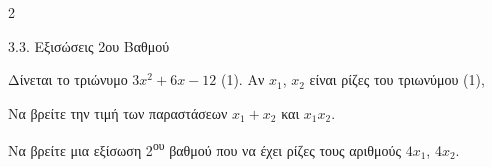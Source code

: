 \begin{ylh}{2}
    \item 3.3. Εξισώσεις 2ου Βαθμού
\end{ylh}
Δίνεται το τριώνυμο $3x^{2} + 6x - 12$ (1). Αν $x_{1}$, $x_{2}$ είναι ρίζες του τριωνύμου (1),

\begin{alist}
\item Να βρείτε την τιμή των παραστάσεων $x_{1} + x_{2}$ και $x_{1}x_{2}$.
\item Να βρείτε μια εξίσωση 2\textsuperscript{ου} βαθμού που να έχει ρίζες τους αριθμούς ${4x}_{1}$, 4$x_{2}$.
\end{alist}

